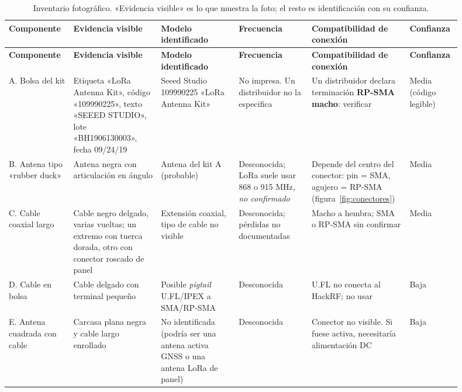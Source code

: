 {\footnotesize
\begin{longtable}{@{}>{\raggedright\arraybackslash}p{0.13\linewidth}>{\raggedright\arraybackslash}p{0.18\linewidth}>{\raggedright\arraybackslash}p{0.16\linewidth}>{\raggedright\arraybackslash}p{0.15\linewidth}>{\raggedright\arraybackslash}p{0.19\linewidth}>{\raggedright\arraybackslash}p{0.09\linewidth}@{}}
\caption{Inventario fotográfico. «Evidencia visible» es lo que muestra la foto; el resto es identificación con su confianza.}\label{tab:inventario}\\
\toprule
\textbf{Componente} & \textbf{Evidencia visible} & \textbf{Modelo identificado} & \textbf{Frecuencia} & \textbf{Compatibilidad de conexión} & \textbf{Confianza} \\
\midrule
\endfirsthead
\toprule
\textbf{Componente} & \textbf{Evidencia visible} & \textbf{Modelo identificado} & \textbf{Frecuencia} & \textbf{Compatibilidad de conexión} & \textbf{Confianza} \\
\midrule
\endhead
A. Bolsa del kit & Etiqueta «LoRa Antenna Kit», código «109990225», texto «SEEED STUDIO», lote «BH1906130003», fecha 09/24/19 & Seeed Studio 109990225 «LoRa Antenna Kit» & No impresa. Un distribuidor no la especifica & Un distribuidor declara terminación \textbf{RP-SMA macho}: verificar & Media (código legible) \\
B. Antena tipo «rubber duck» & Antena negra con articulación en ángulo & Antena del kit A (probable) & Desconocida; LoRa suele usar 868 o 915 MHz, \emph{no confirmado} & Depende del centro del conector: pin = SMA, agujero = RP-SMA (figura~\ref{fig:conectores}) & Media \\
C. Cable coaxial largo & Cable negro delgado, varias vueltas; un extremo con tuerca dorada, otro con conector roscado de panel & Extensión coaxial, tipo de cable no visible & Desconocida; pérdidas no documentadas & Macho a hembra; SMA o RP-SMA sin confirmar & Media \\
D. Cable en bolsa & Cable delgado con terminal pequeño & Posible \emph{pigtail} U.FL/IPEX a SMA/RP-SMA & Desconocida & U.FL no conecta al HackRF; no usar & Baja \\
E. Antena cuadrada con cable & Carcasa plana negra y cable largo enrollado & No identificada (podría ser una antena activa GNSS o una antena LoRa de panel) & Desconocida & Conector no visible. Si fuese activa, necesitaría alimentación DC & Baja \\
\bottomrule
\end{longtable}
}

